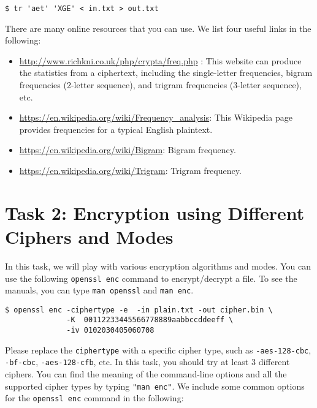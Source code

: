 \begin{lstlisting}
$ tr 'aet' 'XGE' < in.txt > out.txt
\end{lstlisting}
 

There are many online resources that you can use. We list four useful links in
the following: 


\begin{itemize}
\item \url{http://www.richkni.co.uk/php/crypta/freq.php} : This website can produce the
statistics from a ciphertext, including the single-letter frequencies, bigram 
frequencies (2-letter sequence), and trigram frequencies (3-letter sequence), etc. 

\item \url{https://en.wikipedia.org/wiki/Frequency_analysis}: This Wikipedia page
provides frequencies for a typical English plaintext. 

\item \url{https://en.wikipedia.org/wiki/Bigram}: Bigram frequency.

\item  \url{https://en.wikipedia.org/wiki/Trigram}: Trigram frequency.
\end{itemize}
 
 


\section{Task 2: Encryption using Different Ciphers and Modes}

In this task, we will play with various encryption algorithms 
and modes. You can use the following {\tt openssl enc} 
command to encrypt/decrypt a file. To see the manuals, you can 
type {\tt man openssl} and {\tt man enc}.

\begin{lstlisting}
$ openssl enc -ciphertype -e  -in plain.txt -out cipher.bin \
              -K  00112233445566778889aabbccddeeff \
              -iv 0102030405060708 
\end{lstlisting}

Please replace the {\tt ciphertype} with a specific cipher type,
such as {\tt -aes-128-cbc}, {\tt -bf-cbc}, {\tt -aes-128-cfb},
etc. In this task, you should try at least 3 different ciphers. 
You can find the meaning of the 
command-line options and all the supported cipher types 
by typing {\tt "man enc"}.
We include some common options for the {\tt openssl enc} 
command in the following:

